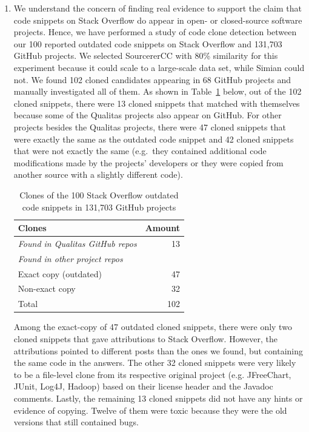 \documentclass[a4paper,twoside,10pt]{reviewresponse}
\begin{document}
\begin{enumerate}
	\item We understand the concern of finding real evidence to support the claim that code snippets on Stack Overflow do appear in open- or closed-source software projects. Hence, we have performed a study of code clone detection between our 100 reported outdated code snippets on Stack Overflow and 131,703 GitHub projects. We selected SourcererCC with 80\% similarity for this experiment because it could scale to a large-scale data set, while Simian could not. We found 102 cloned candidates appearing in 68 GitHub projects and manually investigated all of them. As shown in Table~\ref{tab:outdated_github} below, out of the 102 cloned snippets, there were 13 cloned snippets that matched with themselves because some of the Qualitas projects also appear on GitHub. For other projects besides the Qualitas projects, there were 47 cloned snippets that were exactly the same as the outdated code snippet and 42 cloned snippets that were not exactly the same (e.g.~they contained additional code modifications made by the projects' developers or they were copied from another source with a slightly different code). 
	
	\begin{table}[H]
		\centering
		\begin{tabular}{lr}
			\toprule
			Clones & Amount \\
			\midrule
			\textit{Found in Qualitas GitHub repos} & 13 \\
			\midrule
			\textit{Found in other project repos} & \\
			Exact copy (outdated) & 47 \\
			Non-exact copy & 32 \\
			\midrule
			Total & 102 \\
			\bottomrule
		\end{tabular}
		\label{tab:outdated_github}
		\caption{Clones of the 100 Stack Overflow outdated code snippets in 131,703 GitHub projects}
	\end{table}

	Among the exact-copy of 47 outdated cloned snippets, there were only two cloned
snippets that gave attributions to Stack Overflow. However, the attributions
pointed to different posts than the ones we found, but containing the same code
in the answers. The other 32 cloned snippets were very likely to be a
file-level clone from its respective original project (e.g. JFreeChart, JUnit,
Log4J, Hadoop) based on their license header and the Javadoc comments. Lastly,
the remaining 13 cloned snippets did not have any hints or evidence of copying.
Twelve of them were toxic because they were the old versions that still
contained bugs.


\end{enumerate}
\end{document}
